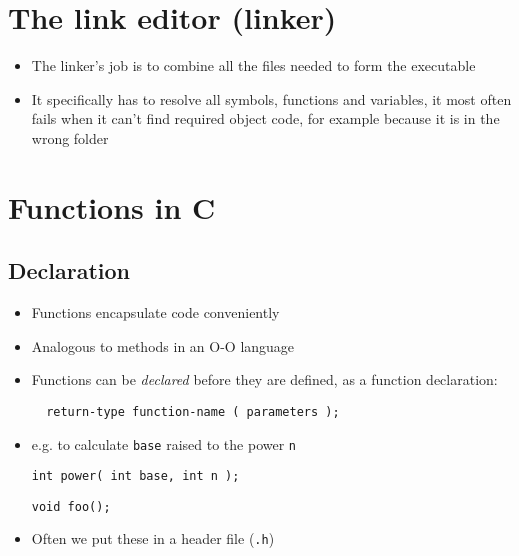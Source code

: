 \documentclass{article}
\begin{document}
\section{The link editor (linker)}
\begin{center}
\end{center}
\begin{itemize}
\item The linker's job is to combine all the files needed to form the executable

\item It specifically has to resolve all symbols, functions and variables, it most often fails when it can't find required object code, for example because it is in the wrong folder
\end{itemize}


\section{Functions in C}
\subsection{Declaration}
\begin{itemize}
\item Functions encapsulate code conveniently 
\item Analogous to methods in an O-O language

\item Functions can be \emph{declared} before they are defined, as a function declaration:

\begin{verbatim}
  return-type function-name ( parameters );
\end{verbatim}

\item e.g. to calculate  \verb!base! raised to the power \verb!n! 

\begin{verbatim}
int power( int base, int n );
\end{verbatim}
\begin{verbatim}
void foo();
\end{verbatim}

\item Often we put these in a header file (\verb!.h!)
\end{itemize}
\end{document}
